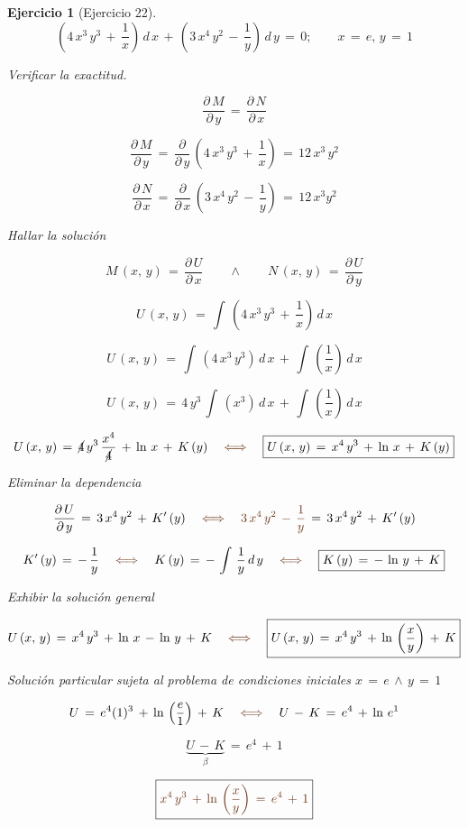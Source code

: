 \documentclass[a4paper,11pt,openany]{book}
\newtheorem{ejer}{Ejercicio}[section]
\begin{document}
\begin{ejer}[Ejercicio 22] 

  $$\left(4\,x^{3}\,y^{3}\,+\,\dfrac{1}{x} \right)\,d\,x\,+\,\left(3\,x^{4}\,y^{2}\,-\,\dfrac{1}{y} \right)\,d\,y\,=\,0; \qquad x\,=\,e, \, y\,=\,1$$ 


 Verificar la exactitud. 

$$\dfrac{\partial\,M}{\partial\,y}\,=\,\dfrac{\partial\,N}{\partial\,x}$$ 

$$\dfrac{\partial\,M}{\partial\,y}\,=\,\dfrac{\partial}{\partial\,y}\,\left(4\,x^{3}\,y^{3}\,+\,\dfrac{1}{x} \right)\,=\,\boxed{12\,x^{3}\,y^{2}}$$ 

$$\dfrac{\partial\,N}{\partial\,x}\,=\,\dfrac{\partial}{\partial\,x}\,\left(3\,x^{4}\,y^{2}\,-\,\dfrac{1}{y} \right)\,=\,\boxed{12\,x^{3}y^{2}} $$ 

 Hallar la solución 

$$\boxed{M\,(x,\,y)\,=\,\dfrac{\partial\,U}{\partial\,x}} \qquad \wedge \qquad \boxed{N\,(x,\,y)\,=\,\dfrac{\partial\,U}{\partial\,y}}$$

$$U\,(x,\,y)\,=\,\int\,\left(4\,x^{3}\,y^{3}\,+\,\dfrac{1}{x} \right)\,d\,x$$ 

$$U\,(x,\,y)\,=\,\int\,\left(4\,x^{3}\,y^{3} \right)\,d\,x\,+\,\int\,\left(\dfrac{1}{x} \right)\,d\,x$$ 

$$U\,(x,\,y)\,=\,4\,y^{3}\,\int\,\left(x^{3} \right)\,d\,x\,+\,\int\,\left(\dfrac{1}{x} \right)\,d\,x $$ 

$$U\,(x,\,y)\,=\,\cancel{4}\,y^{3}\,\dfrac{x^{4}}{\cancel{4}}\,+\,\ln\,x\,+\,K\,(y) \quad \textcolor{auburn}{\iff} \quad \boxed{U\,(x,\,y)\,=\,x^{4}\,y^{3}\,+\,\ln\,x\,+\,K\,(y)} $$ 

 Eliminar la dependencia 

$$\dfrac{\partial\,U}{\partial\,y}\,=\, 3\,x^{4}\,y^{2}\,+\,K'\,(y) \quad \textcolor{auburn}{\iff} \quad \textcolor{auburn}{3\,x^{4}\,y^{2}\,-\,\dfrac{1}{y}}\,=\,3\,x^{4}\,y^{2}\,+\,K'\,(y)$$ 

$$K'\,(y)\,=\,-\,\dfrac{1}{y} \quad \textcolor{auburn}{\iff} \quad K\,(y)\,=\,-\,\int\,\dfrac{1}{y}\,d\,y \quad \textcolor{auburn}{\iff} \quad \boxed{K\,(y)\,=\,-\,\ln\,y\,+\,K}$$ 

 Exhibir la solución general  

$$U\,(x,\,y)\,=\,x^{4}\,y^{3}\,+\,\ln\,x\,-\,\ln\,y\,+\,K \quad \textcolor{auburn}{\iff} \quad \boxed{U\,(x,\,y)\,=\,x^{4}\,y^{3}\,+\,\ln\,\left(\dfrac{x}{y} \right)\,+\,K }$$ 

 Solución particular sujeta al problema de condiciones iniciales $\boxed{x\,=\,e \, \wedge \, y\,=\,1}$ 

$$U\,=\,e^{4}(1)^{3}\,+\,\ln\,\left(\dfrac{e}{1} \right)\,+\,K \quad \textcolor{auburn}{\iff} \quad U\,-\,K\,=\,e^{4}\,+\,\ln\,e^{1}$$ 

$$\underbrace{U\,-\,K}_{\beta}\,=\,e^{4}\,+\,1$$ 

$$\boxed{\textcolor{auburn}{x^{4}\,y^{3}\,+\,\ln\,\left(\dfrac{x}{y} \right)\,=\,e^{4}\,+\,1}} $$ 

\end{ejer} 
\end{document}
